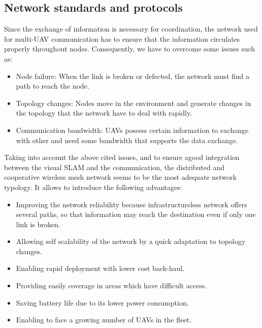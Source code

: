 \documentclass[11pt,openany]{book}
\begin{document}
\begin{algorimth}[H]
\subsection{Network standards and protocols}
Since the exchange of information is necessary for coordination, the network used for multi-UAV communication has to ensure that the information circulates properly throughout nodes. Consequently, we have to overcome some issues such as:
\begin{itemize}
    \item Node failure: When the link is broken or defected, the network must ﬁnd a path to reach the node.
    \item Topology changes: Nodes move in the environment and generate changes in the topology that the network have to deal with rapidly.
    \item Communication bandwidth: UAVs possess certain information to exchange with other and need some bandwidth that supports the data exchange.
\end{itemize}
Taking into account the above cited issues, and to ensure agood integration between the visual SLAM and the communication, the distributed and cooperative wireless mesh network seems to be the most adequate network typology. It allows to introduce the following advantages:
\begin{itemize}
    \item Improving the network reliability because infrastructureless network oﬀers several paths, so that information may reach the destination even if only one link is broken.
    \item Allowing self scalability of the network by a quick adaptation to topology changes.
    \item Enabling rapid deployment with lower cost back-haul.
    \item Providing easily coverage in areas which have diﬃcult access.
    \item Saving battery life due to its lower power consumption.
    \item Enabling to face a growing number of UAVs in the ﬂeet.
\end{itemize}

\end{algorimth}
\end{document}
